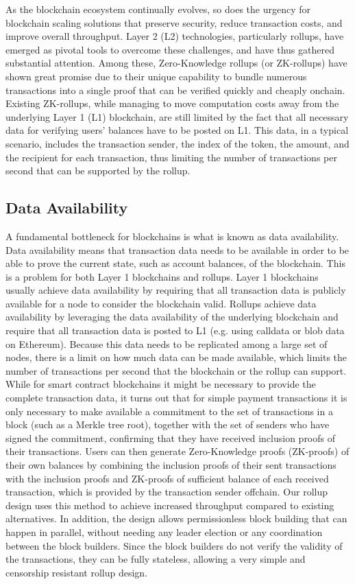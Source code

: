 As the blockchain ecosystem continually evolves, so does the urgency
for blockchain scaling solutions that preserve security, reduce
transaction costs, and improve overall throughput. Layer 2 (L2)
technologies, particularly rollups, have emerged as pivotal tools to
overcome these challenges, and have thus gathered substantial
attention. Among these, Zero-Knowledge rollups (or ZK-rollups) have
shown great promise due to their unique capability to bundle numerous
transactions into a single proof that can be verified quickly and
cheaply onchain. Existing ZK-rollups, while managing to move
computation costs away from the underlying Layer 1 (L1) blockchain,
are still limited by the fact that all necessary data for verifying
users' balances have to be posted on L1. This data, in a typical
scenario, includes the transaction sender, the index of the token,
the amount, and the recipient for each transaction, thus limiting the
number of transactions per second that can be supported by the rollup.

\subsection{Data Availability}

A fundamental bottleneck for blockchains is what is known as data
availability. Data availability means that transaction data needs to
be available in order to be able to prove the current state, such as
account balances, of the blockchain. This is a problem for both Layer
1 blockchains and rollups. Layer 1 blockchains usually achieve data
availability by requiring that all transaction data is publicly
available for a node to consider the blockchain valid. Rollups
achieve data availability by leveraging the data availability of the
underlying blockchain and require that all transaction data is posted
to L1 (e.g. using calldata or blob data on Ethereum). Because this
data needs to be replicated among a large set of nodes, there is a
limit on how much data can be made available, which limits the number
of transactions per second that the blockchain or the rollup can
support. While for smart contract blockchains it might be necessary
to provide the complete transaction data, it turns out that for
simple payment transactions it is only necessary to make available a
commitment to the set of transactions in a block (such as a Merkle
tree root), together with the set of senders who have signed the
commitment, confirming that they have received inclusion proofs of
their transactions. Users can then generate Zero-Knowledge proofs
(ZK-proofs) of their own balances by combining the inclusion proofs
of their sent transactions with the inclusion proofs and ZK-proofs of
sufficient balance of each received transaction, which is provided by
the transaction sender offchain. Our rollup design uses this method
to achieve increased throughput compared to existing alternatives. In
addition, the design allows permissionless block building that can
happen in parallel, without needing any leader election or any
coordination between the block builders. Since the block builders do
not verify the validity of the transactions, they can be fully
stateless, allowing a very simple and censorship resistant rollup design.

